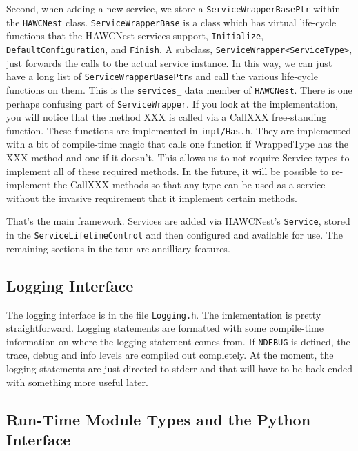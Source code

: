 \documentclass[12pt]{article}
\begin{document}
Second, when adding a new service, we store a 
{\tt ServiceWrapperBasePtr}
within the {\tt HAWCNest} class. 
{\tt ServiceWrapperBase} is a class which has virtual
 life-cycle functions that the HAWCNest services support, {\tt Initialize},
{\tt DefaultConfiguration}, and {\tt Finish}. A subclass, 
{\tt ServiceWrapper<ServiceType>}, just forwards the calls to the 
actual service instance. In this way, we can just have a long list
of {\tt ServiceWrapperBasePtr}s and call the various life-cycle functions
on them. This is the {\tt services\_} data member of {\tt HAWCNest}.
There is one perhaps confusing part of {\tt ServiceWrapper}. If you look at 
the implementation, you will notice that the method XXX is called via
a CallXXX free-standing function.  These functions are implemented in 
{\tt impl/Has.h}. They are implemented with a bit of 
compile-time magic that calls one function if WrappedType has the XXX method
and one if it doesn't.  This allows us to not require Service types to 
implement all of these required methods. In the future, it will be 
possible to re-implement the CallXXX methods so that any type can be used
as a service without the invasive requirement that it implement certain 
methods.

That's the main framework. Services are added via HAWCNest's 
{\tt Service}, stored
in the {\tt ServiceLifetimeControl} and then configured and available for use.
The remaining sections in the tour are ancilliary features.

\subsection{Logging Interface}

The logging interface is in the file {\tt Logging.h}.  The imlementation is 
pretty straightforward. Logging statements are formatted with some compile-time
information on where the logging statement comes from. If {\tt NDEBUG}
is defined, the trace, debug and info levels are compiled out completely.
At the moment, the logging statements are just directed to stderr
and that will have to be back-ended with something more useful later.

\subsection{Run-Time Module Types and the Python Interface}
\end{document}

